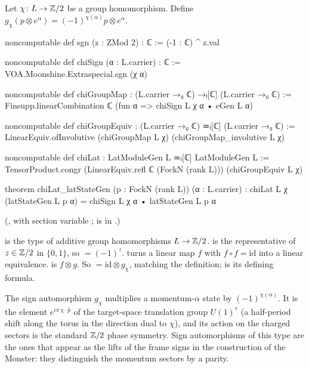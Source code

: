 \begin{definition}\label{ch03:def:chiLat}
Let $\chi\colon L\to{\mathbb{Z}}/2$ be a group homomorphism. Define $g_\chi(p\otimes e^\alpha)=
(-1)^{\chi(\alpha)}p\otimes e^\alpha$.
\end{definition}
\begin{leancode}
noncomputable def sgn (z : ZMod 2) : ℂ := (-1 : ℂ) ^ z.val

noncomputable def chiSign (α : L.carrier) : ℂ := VOA.Moonshine.Extraspecial.sgn (χ α)

noncomputable def chiGroupMap : (L.carrier →₀ ℂ) →ₗ[ℂ] (L.carrier →₀ ℂ) :=
  Finsupp.linearCombination ℂ (fun α => chiSign L χ α • eGen L α)

noncomputable def chiGroupEquiv : (L.carrier →₀ ℂ) ≃ₗ[ℂ] (L.carrier →₀ ℂ) :=
  LinearEquiv.ofInvolutive (chiGroupMap L χ) (chiGroupMap_involutive L χ)

noncomputable def chiLat : LatModuleGen L ≃ₗ[ℂ] LatModuleGen L :=
  TensorProduct.congr (LinearEquiv.refl ℂ (FockN (rank L))) (chiGroupEquiv L χ)

theorem chiLat_latStateGen (p : FockN (rank L)) (α : L.carrier) :
    chiLat L χ (latStateGen L p α) = chiSign L χ α • latStateGen L p α
\end{leancode}
(, with section variable ;
 is in .)

\begin{dictionary}
 is the type of additive group homomorphisms $L\to{\mathbb{Z}}/2$.
 is the representative of $z\in{\mathbb{Z}}/2$ in $\{0,1\}$, so  $=(-1)^z$.
 turns a linear map $f$ with $f\circ f=\mathrm{id}$ into a linear
equivalence.  is $f\otimes g$. So  $=\mathrm{id}\otimes
g_\chi$, matching the definition;  is its defining formula.
\end{dictionary}

\begin{physics}
The sign automorphism $g_\chi$ multiplies a momentum-$\alpha$ state by $(-1)^{\chi(\alpha)}$. It is the element $e^{i\pi\,\chi\cdot\hat p}$ of the target-space translation group $U(1)^r$ (a half-period shift along the torus in the direction dual to $\chi$), and its action on the charged sectors is the standard ${\mathbb{Z}}/2$ phase symmetry. Sign automorphisms of this type are the ones that appear as the lifts of the frame signs in the construction of the Monster: they distinguish the momentum sectors by a parity.
\end{physics}

